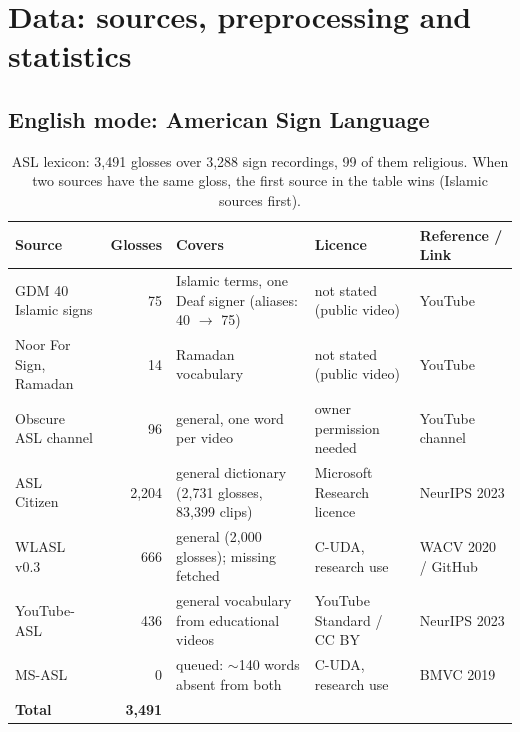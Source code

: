 \chapter{Data: sources, preprocessing and statistics}
\label{sec:lexicons}




\section{English mode: American Sign Language}
\begin{table}[ht]
\centering\small
\caption{ASL lexicon: 3,491 glosses over 3,288 sign recordings, 99 of
them religious. When two sources have the same gloss, the first source in the table wins (Islamic sources first).}
\label{tab:asl}
\begin{tabularx}{\textwidth}{L{3.2cm} r L{3.5cm} L{3.0cm} Y}
\toprule
Source & Glosses & Covers & Licence & Reference / Link \\
\midrule
GDM 40 Islamic signs\footnotemark & 75 & Islamic terms, one Deaf signer (aliases: 40 $\rightarrow$ 75) & not stated (public video) & YouTube  \\
Noor For Sign, Ramadan\footnotemark & 14 & Ramadan vocabulary & not stated (public video) & YouTube  \\
Obscure ASL channel\footnotemark & 96 & general, one word per video & owner permission needed & YouTube channel \\
ASL Citizen~\cite{aslcitizen}\footnotemark & 2,204 & general dictionary (2,731 glosses, 83,399 clips) & Microsoft Research licence & NeurIPS 2023 \\
WLASL v0.3~\cite{wlasl}\footnotemark & 666 & general (2,000 glosses); missing fetched & C-UDA, research use & WACV 2020 / GitHub \\
YouTube-ASL~\cite{youtubeasl}\footnotemark & 436 & general vocabulary from educational videos & YouTube Standard / CC BY & NeurIPS 2023 \\
MS-ASL~\cite{msasl}\footnotemark & 0 & queued: $\sim$140 words absent from both & C-UDA, research use & BMVC 2019 \\
\midrule
\textbf{Total} & \textbf{3,491} & & & \\
\bottomrule
\end{tabularx}
\end{table}
\addtocounter{footnote}{-7}%
%
%
%
%
%
%
%


